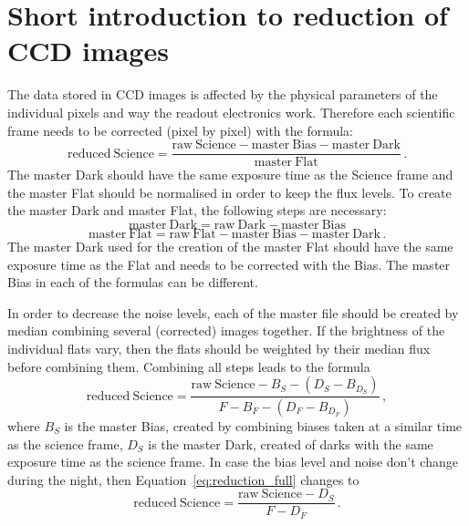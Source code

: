 \documentclass[10pt,a4paper]{article}
\begin{document}
\newpage
\section{Short introduction to reduction of CCD images}

The data stored in CCD images is affected by the physical parameters of the individual pixels and way the readout electronics work. Therefore each scientific frame needs to be corrected (pixel by pixel) with the formula:
\begin{equation}
  \mathrm{reduced\ Science} = \frac{\mathrm{raw\ Science} - \mathrm{master\ Bias} - \mathrm{master\ Dark}}{\mathrm{master\ Flat}}\,.
\end{equation}
The master Dark should have the same exposure time as the Science frame and the master Flat should be normalised in order to keep the flux levels. To create the master Dark and master Flat, the following steps are necessary:
\begin{equation}
  \mathrm{master\ Dark} = \mathrm{raw\ Dark} - \mathrm{master\ Bias}
\end{equation}
\begin{equation}
  \mathrm{master\ Flat} = \mathrm{raw\ Flat} - \mathrm{master\ Bias} - \mathrm{master\ Dark}\,.
\end{equation}
The master Dark used for the creation of the master Flat should have the same exposure time as the Flat and needs to be corrected with the Bias. The master Bias in each of the formulas can be different.

In order to decrease the noise levels, each of the master file should be created by median combining several (corrected) images together. If the brightness of the individual flats vary, then the flats should be weighted by their median flux before combining them. Combining all steps leads to the formula
\begin{equation}
  \label{eq:reduction_full}
  \mathrm{reduced\ Science} = \frac{\mathrm{raw\ Science} - B_S - (D_S - B_{D_S})}{F - B_F - (D_F - B_{D_F})}\,,
\end{equation}
where $B_S$ is the master Bias, created by combining biases taken at a similar time as the science frame, $D_S$ is the master Dark, created of darks with the same exposure time as the science frame. In case the bias level and noise don't change during the night, then Equation~\ref{eq:reduction_full} changes to
\begin{equation}
  \mathrm{reduced\ Science} = \frac{\mathrm{raw\ Science} - D_S}{F - D_F}\,.
\end{equation}
\end{document}
